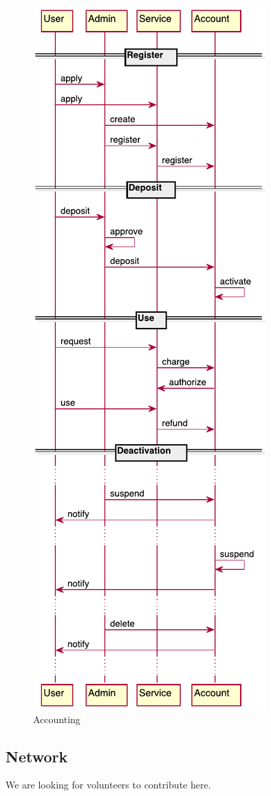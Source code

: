 \documentclass[10pt]{article}
\begin{document}
\begin{figure}[!h]
\centering
\includegraphics[width=0.5\columnwidth]{images/uml/account.pdf}
\caption{Accounting}\label{F:uml-accounting}
\end{figure}



\subsection{Network}

We are looking for volunteers to contribute here.


%
\end{document}
